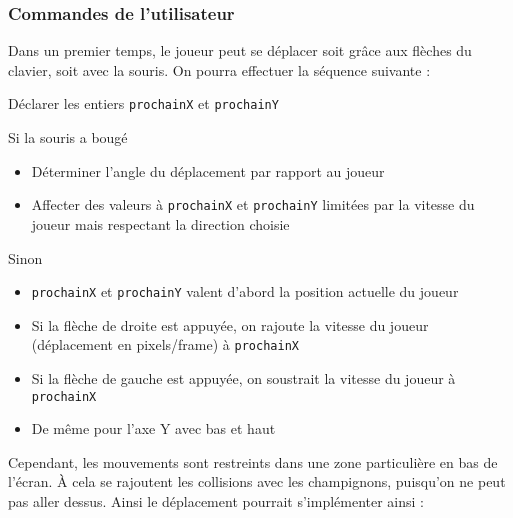 \subsubsection{Commandes de l'utilisateur}
Dans un premier temps, le joueur peut se déplacer soit grâce aux flèches du clavier, soit avec la souris. On pourra effectuer la séquence suivante :
\begin{algoinfo}
	\item Déclarer les entiers \texttt{prochainX} et \texttt{prochainY}
	\item Si la souris a bougé
	\begin{itemize}
		\item Déterminer l'angle du déplacement par rapport au joueur
		\item Affecter des valeurs à \texttt{prochainX} et \texttt{prochainY} limitées par la vitesse du joueur mais respectant la direction choisie
	\end{itemize}
	\item Sinon
	\begin{itemize}
		\item \texttt{prochainX} et \texttt{prochainY} valent d'abord la position actuelle du joueur
		\item Si la flèche de droite est appuyée, on rajoute la vitesse du joueur (déplacement en pixels/frame) à \texttt{prochainX}
		\item Si la flèche de gauche est appuyée, on soustrait la vitesse du joueur à \texttt{prochainX}
		\item De même pour l'axe Y avec bas et haut
	\end{itemize}
\end{algoinfo}


Cependant, les mouvements sont restreints dans une zone particulière en bas de l'écran. À cela se rajoutent les collisions avec les champignons, puisqu'on ne peut pas aller dessus. Ainsi le déplacement pourrait s'implémenter ainsi :

